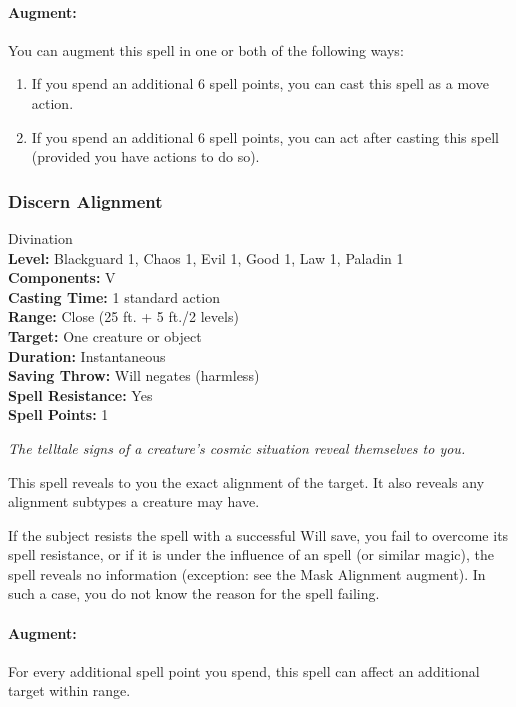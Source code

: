 \paragraph{Augment:} You can augment this spell in one or both of the following ways:
\begin{enumerate}
 \item If you spend an additional 6 spell points, you can cast this spell as a move action.
 \item If you spend an additional 6 spell points, you can act after casting this spell (provided you have actions to do so).
\end{enumerate}
\subsubsection{Discern Alignment}
\label{Spell:DiscernAlignment}
Divination
\\ \textbf{Level:} Blackguard 1, Chaos 1, Evil 1, Good 1, Law 1, Paladin 1
\\ \textbf{Components:} V
\\ \textbf{Casting Time:} 1 standard action
\\ \textbf{Range:} Close (25 ft. + 5 ft./2 levels)
\\ \textbf{Target:} One creature or object
\\ \textbf{Duration:} Instantaneous
\\ \textbf{Saving Throw:} Will negates (harmless)
\\ \textbf{Spell Resistance:} Yes
\\ \textbf{Spell Points:} 1

\emph{The telltale signs of a creature's cosmic situation reveal themselves to you.}

This spell reveals to you the exact alignment of the target.
It also reveals any alignment subtypes a creature may have.

If the subject resists the spell with a successful Will save, you fail to overcome its spell resistance, 
or if it is under the influence of an  spell (or similar magic),
the spell reveals no information (exception: see the Mask Alignment augment). 
In such a case, you do not know the reason for the spell failing.

\paragraph{Augment:} For every additional spell point you spend, this spell can affect an additional target within range.
